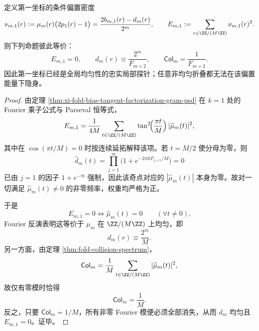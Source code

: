 \begin{theorem}[第一坐标偏置能量的谱忠实性]\label{thm:conclusion-first-coordinate-bias-energy-spectral-faithfulness}
定义第一坐标的条件偏置密度
\[
\nu_{m,1}(r):=\mu_m(r)\bigl(2p_1(r)-1\bigr)
=
\frac{2b_{m,1}(r)-d_m(r)}{2^m},
\qquad
E_{m,1}:=\sum_{r\in\ZZ/(M\ZZ)}\nu_{m,1}(r)^2.
\]
则下列命题彼此等价：
\[
E_{m,1}=0,
\qquad
d_m(r)\equiv \frac{2^m}{F_{m+2}},
\qquad
\mathsf{Col}_m=\frac{1}{F_{m+2}}.
\]
因此第一坐标已经是全局均匀性的忠实局部探针；任意非均匀折叠都无法在该偏置能量下隐身。
\end{theorem}
\begin{proof}
由定理 \ref{thm:xi-fold-bias-tangent-factorization-gram-psd} 在 \(k=1\) 处的 Fourier 乘子公式与 Parseval 恒等式，
\[
E_{m,1}
=
\frac{1}{4M}
\sum_{t\in\ZZ/(M\ZZ)}
\tan^2\!\Bigl(\frac{\pi t}{M}\Bigr)\,
|\widehat\mu_m(t)|^2,
\]
其中在 \(\cos(\pi t/M)=0\) 时按连续延拓解释该项。若 \(t=M/2\) 使分母为零，则
\[
\widehat d_m(t)=\prod_{j=1}^{m}\bigl(1+e^{-2\pi \mathrm{i}tF_{j+1}/M}\bigr)=0
\]
已由 \(j=1\) 的因子 \(1+e^{-\pi \mathrm{i}}\) 强制，因此该奇点对应的 \(|\widehat\mu_m(t)|\) 本身为零。故对一切满足 \(\widehat\mu_m(t)\neq 0\) 的非零频率，权重均严格为正。

于是
\[
E_{m,1}=0
\iff
\widehat\mu_m(t)=0\qquad(\forall t\neq 0).
\]
Fourier 反演表明这等价于 \(\mu_m\) 在 \(\ZZ/(M\ZZ)\) 上均匀，即
\[
d_m(r)\equiv \frac{2^m}{M}.
\]
另一方面，由定理 \ref{thm:fold-collision-spectrum}，
\[
\mathsf{Col}_m
=
\frac{1}{M}\sum_{t\in\ZZ/(M\ZZ)}|\widehat\mu_m(t)|^2,
\]
故仅有零模时恰得
\[
\mathsf{Col}_m=\frac{1}{M}.
\]
反之，只要 \(\mathsf{Col}_m=1/M\)，所有非零 Fourier 模便必须全部消失，从而 \(d_m\) 均匀且 \(E_{m,1}=0\)。证毕。
\end{proof}

